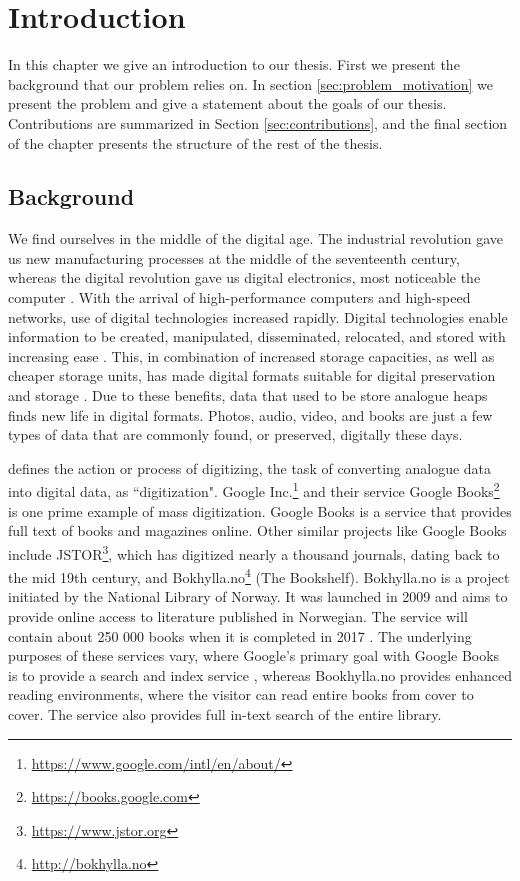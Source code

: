
\chapter{Introduction}
\label{ch:introduction}
In this chapter we give an introduction to our thesis. First we present the background that our problem relies on. In section \ref{sec:problem_motivation} we present the problem and give a statement about the goals of our thesis. Contributions are summarized in Section \ref{sec:contributions}, and the final section of the chapter presents the structure of the rest of the thesis.

\section{Background}
We find ourselves in the middle of the digital age. The industrial revolution gave us new manufacturing processes at the middle of the seventeenth century, whereas the digital revolution gave us digital electronics, most noticeable the computer \citep{freeman2001time}. With the arrival of high-performance computers and high-speed networks, use of digital technologies increased rapidly. Digital technologies enable information to be created, manipulated, disseminated, relocated, and stored with increasing ease \citep{lee2002state}. This, in combination of increased storage capacities, as well as cheaper storage units, has made digital formats suitable for digital preservation and storage \citep{morris2003evolution}. Due to these benefits, data that used to be store analogue heaps finds new life in digital formats. Photos, audio, video, and books are just a few types of data that are commonly found, or preserved, digitally these days.

\citep{misc-oed-digitization} defines the action or process of digitizing, the task of converting analogue data into digital data, as ``digitization". Google Inc.\footnote{\url{https://www.google.com/intl/en/about/}} and their service Google Books\footnote{\url{https://books.google.com}} is one prime example of mass digitization. Google Books is a service that provides full text of books and magazines online. Other similar projects like Google Books include JSTOR\footnote{\url{https://www.jstor.org}}, which has digitized nearly a thousand journals, dating back to the mid 19th century, and Bokhylla.no\footnote{\url{http://bokhylla.no}} (The Bookshelf). Bokhylla.no is a project initiated by the National Library of Norway. It was launched in 2009 and aims to provide online access to literature published in Norwegian. The service will contain about 250 000 books when it is completed in 2017 \citep{misc-nb-digial-library}. The underlying purposes of these services vary, where Google's primary goal with Google Books is to provide a search and index service \citep{coyle2006mass}, whereas Bookhylla.no provides enhanced reading environments, where the visitor can read entire books from cover to cover. The service also provides full in-text search of the entire library. 

